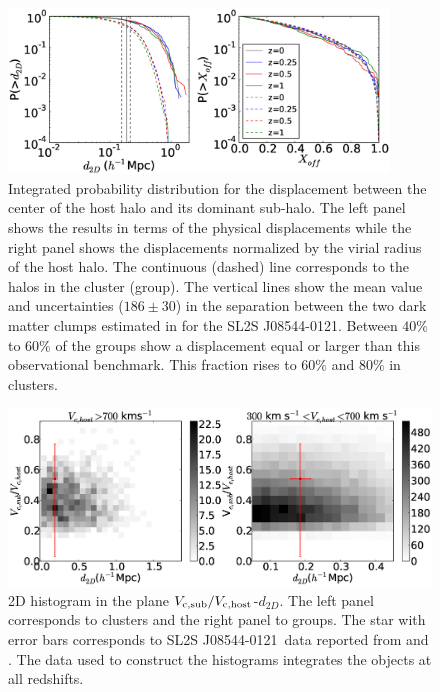 \documentclass{emulateapj}
\newcommand{\hkpc}{{\ifmmode{h^{-1}{\rm kpc}}\else{$h^{-1}$kpc }\fi}}
\newcommand{\bullg}{SL2S J08544-0121}
\begin{document}
\begin{figure}
\begin{center}
\includegraphics[width=0.9\textwidth]{figure_1.eps}
\end{center}
\caption{
  Integrated probability distribution for the displacement between the
  center of the host halo and its dominant sub-halo. The left panel
  shows the results in terms of the physical displacements while the
  right panel shows the displacements normalized by the virial radius
  of the host halo. The continuous (dashed) line corresponds to the halos in the
  cluster (group).
  The vertical lines show the mean value and uncertainties ($186\pm
  30$\hkpc) in the  separation between the two dark matter clumps
  estimated in \citet{Gastaldello} for the \bullg. Between $40\%$
  to $60\%$ of the groups show a displacement equal or larger than
  this observational benchmark. This fraction rises to $60\%$ and
  $80\%$ in clusters.}
\label{fig:displacement}
\end{figure}

\begin{figure}
\begin{center}
\includegraphics[width=1.0\textwidth]{figure_2.eps} 
\end{center}
\caption{2D histogram in the plane $V_{\rm c,sub}/V_{\rm
    c,host}$-$d_{2D}$. The left panel corresponds to clusters and the
  right panel to groups. The star with error bars corresponds to
  \bullg\ data reported from \citet{2013A&A...552A..80M} and
  \citet{Gastaldello}. The data used to construct the histograms
  integrates the objects at all redshifts. }
\label{fig:mass_displacement}
\end{figure}
\end{document}
